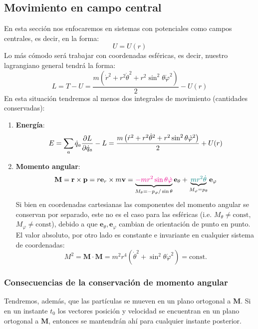 \documentclass[]{article}
\numberwithin{equation}{section}
\begin{document}
\subsection{Movimiento en campo central}
En esta sección nos enfocaremos en sistemas con potenciales como campos centrales, es decir, en la forma:
\begin{equation}
	U = U(r)
\end{equation}
Lo más cómodo será trabajar con coordenadas esféricas, es decir, nuestro lagrangiano general tendrá la forma:
\begin{equation}
	L = T - U = \frac{m\left(\dot{r}^2 + r^2\dot{\theta}^2 + r^2\sin^2\theta \dot{\varphi}^2\right)}{2} - U(r)
\end{equation}
En esta situación tendremos al menos dos integrales de movimiento (cantidades conservadas):
\begin{enumerate}
	\item \textbf{Energía}:
	\begin{equation}
		E = \sum_{a} \dot{q}_a\dfrac{\partial L}{\partial \dot{q}_a} - L = \frac{m\left(\dot{r}^2 + r^2\dot{\theta}^2 + r^2\sin^2\theta \dot{\varphi}^2\right)}{2} + U(r)
	\end{equation}
	\item \textbf{Momento angular}:
	\begin{equation}
		\mathbf{M} = \mathbf{r}\times\mathbf{p} = r \mathbf{e}_r \times m\mathbf{v} = \underbrace{\textcolor{magenta}{- m r^2 \sin\theta\dot{\varphi}}}_{M_\theta = -p_\varphi/\sin\theta} \mathbf{e}_\theta + \underbrace{\textcolor{teal}{m r^2\dot{\theta}}}_{M_\varphi = p_\theta} \mathbf{e}_\varphi
	\end{equation}
	Si bien en coordenadas cartesianas las componentes del momento angular se conservan por separado, este no es el caso para las esféricas (i.e. \(M_\theta\neq\mathrm{const}\), \(M_\varphi\neq\mathrm{const}\)), debido a que \(\mathbf{e}_\theta, \mathbf{e}_\varphi\) cambian de orientación de punto en punto.
	El valor absoluto, por otro lado es constante e invariante en cualquier sistema de coordenadas:
	\begin{equation}
		M^2 = \mathbf{M}\cdot\mathbf{M} = m^2r^4\left(\dot{\theta}^2 + \sin^2\theta\dot{\varphi}^2\right) = \mathrm{const.}
	\end{equation}
\end{enumerate}

\subsubsection{Consecuencias de la conservación de momento angular}
Tendremos, además, que las partículas se mueven en un plano ortogonal a \(\mathbf{M}\). Si en un instante \(t_0\) los vectores posición y velocidad se encuentran en un plano ortogonal a \(\mathbf{M}\), entonces se mantendrán ahí para cualquier instante posterior.
\end{document}
